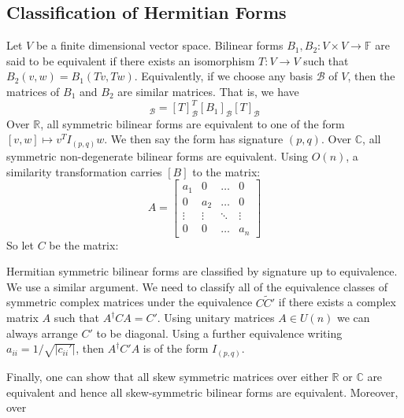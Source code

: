     \subsection{Classification of Hermitian Forms}
        Let $V$ be a finite dimensional vector space. Bilinear forms
        $B_{1},B_{2}:V\times{V}\rightarrow\mathbb{F}$ are said to be
        equivalent if there exists an isomorphism $T:V\rightarrow{V}$
        such that $B_{2}(v,w)=B_{1}(Tv,Tw)$. Equivalently, if we choose
        any basis $\mathscr{B}$ of $V$, then the matrices of $B_{1}$ and
        $B_{2}$ are similar matrices. That is, we have
        \begin{equation}
            [B_{2}]_{\mathscr{B}}=
            [T]_{\mathscr{B}}^{T}[B_{1}]_{\mathscr{B}}[T]_{\mathscr{B}}
        \end{equation}
        Over $\mathbb{R}$, all symmetric bilinear forms are equivalent
        to one of the form $[v,w]\mapsto{v}^{T}I_{(p,q)}w$. We then say
        the form has signature $(p,q)$.
        Over $\mathbb{C}$, all symmetric non-degenerate bilinear forms
        are equivalent. Using $O(n)$, a similarity transformation
        carries $[B]$ to the matrix:
        \begin{equation}
            A=
            \begin{bmatrix}
                a_{1}&0&\dots&0\\
                0&a_{2}&\dots&0\\
                \vdots&\vdots&\ddots&\vdots\\
                0&0&\dots&a_{n}
            \end{bmatrix}
        \end{equation}
        So let $C$ be the matrix:
        \par
        Hermitian symmetric bilinear forms are classified by signature
        up to equivalence. We use a similar argument. We need to
        classify all of the equivalence classes of symmetric complex
        matrices under the equivalence $C\tilde{C}'$ if there exists a
        complex matrix $A$ such that $A^{\dagger}CA=C'$. Using unitary
        matrices $A\in{U}(n)$ we can always arrange $C'$ to be diagonal.
        Using a further equivalence writing $a_{ii}=1/\sqrt{|c_{ii}'|}$,
        then $A^{\dagger}C'A$ is of the form $I_{(p,q)}$.
        \par
        Finally, one can show that all skew symmetric matrices over
        either $\mathbb{R}$ or $\mathbb{C}$ are equivalent and hence all
        skew-symmetric bilinear forms are equivalent. Moreover, over
